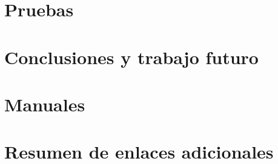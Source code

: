 \documentclass[openright,twoside,11pt]{book}
\begin{document}
\chapter{Pruebas}


\chapter{Conclusiones y trabajo futuro}







\cleardoublepage




\appendix

\chapter{Manuales}\label{aped.A}


\chapter{Resumen de enlaces adicionales}\label{aped.B}

\end{document}
